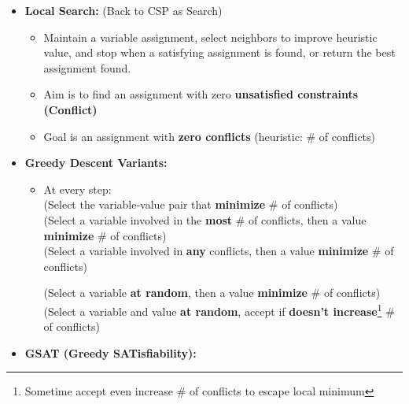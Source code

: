 \documentclass{article}
\theoremstyle{note}
\begin{document}
\begin{itemize}
  \item \textbf{Local Search:} (Back to CSP as Search)
  \begin{itemize}
    \item Maintain a variable assignment, select neighbors to improve heuristic value, and stop when a satisfying assignment is found, or return the best assignment found.
    \item Aim is to find an assignment with zero \textbf{unsatisfied constraints (Conflict)}
    \item Goal is an assignment with \textbf{zero conflicts} (heuristic: \# of conflicts)
  \end{itemize}

  \item \textbf{Greedy Descent Variants:}
  \begin{itemize}
    \item At every step:\\
     (Select the variable-value pair that \textbf{minimize} \# of conflicts)\\
    (Select a variable involved in the \textbf{most} \# of conflicts, then a value \textbf{minimize} \# of conflicts)\\
    (Select a variable involved in \textbf{any} conflicts, then a value \textbf{minimize} \# of conflicts)
    
    (Select a variable \textbf{at random}, then a value \textbf{minimize} \# of conflicts)\\
    (Select a variable and value \textbf{at random}, accept if \textbf{doesn't increase}\footnote{Sometime accept even increase \# of conflicts to escape local minimum} \# of conflicts)
   
  \end{itemize}
  \newpage
  \item \textbf{GSAT (Greedy SATisfiability):}
 

\end{itemize}
\end{document}
